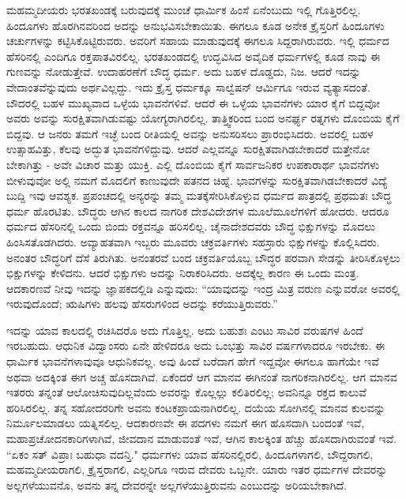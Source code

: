 ಮಹಮ್ಮದೀಯರು ಭರತಖಂಡಕ್ಕೆ ಬರುವುದಕ್ಕೆ ಮುಂಚೆ ಧಾರ್ಮಿಕ ಹಿಂಸೆ ಏನೆಂಬುದು ಇಲ್ಲಿ ಗೊತ್ತಿರಲಿಲ್ಲ. ಹಿಂದೂಗಳು ಹೊರಗಿನವರಿಂದ ಅದನ್ನು ಅನುಭವಿಸಬೇಕಾಯಿತು. ಈಗಲೂ ಕೂಡ ಅನೇಕ ಕ್ರೈಸ್ತರಿಗೆ ಹಿಂದೂಗಳು ಚರ್ಚುಗಳನ್ನು ಕಟ್ಟಿಸಿಕೊಟ್ಟಿರುವರು. ಅವರಿಗೆ ಸಹಾಯ ಮಾಡುವುದಕ್ಕೆ ಈಗಲೂ ಸಿದ್ದರಾಗಿರುವರು. ಇಲ್ಲಿ ಧರ್ಮದ ಹೆಸರಿನಲ್ಲಿ ಎಂದಿಗೂ ರಕ್ತಪಾತವಿರಲಿಲ್ಲ. ಭರತಖಂಡದಲ್ಲಿ ಉದ್ಭವಿಸಿದ ಅವೈದಿಕ ಧರ್ಮಗಳಲ್ಲಿ ಕೂಡ ನಾವು ಈ ಗುಣವನ್ನು ನೋಡುತ್ತೇವೆ. ಉದಾಹರಣೆಗೆ ಬೌದ್ಧ ಧರ್ಮ. ಅದು ಬಹಳ ದೊಡ್ಡದು, ನಿಜ. ಆದರೆ ಇದನ್ನು ವೇದಾಂತವೆನ್ನುವುದು ಅರ್ಥವಿಲ್ಲದ್ದು. ಇದು ಕ್ರೈಸ್ತ ಧರ್ಮಕ್ಕೂ ಸಾಲ್ವೆಷನ್ ಆರ್ಮಿಗೂ ಇರುವ ವ್ಯತ್ಯಾಸದಂತೆ. ಬೌದರಲ್ಲಿ ಬಹಳ ಮುಖ್ಯವಾದ ಒಳ್ಳೆಯ ಭಾವನೆಗಳಿವೆ. ಆದರೆ ಈ ಒಳ್ಳೆಯ ಭಾವನೆಗಳು ಯಾರ ಕೈಗೆ ಬಿದ್ದವೋ ಅವರು ಅವನ್ನು ಸುರಕ್ಷಿತವಾಗಿಡುವಷ್ಟು ಯೋಗ್ಯರಾಗಿರಲಿಲ್ಲ. ತಾತ್ತ್ವಿಕರಿಂದ ಬಂದ ಅನರ್ಘ್ಯ ರತ್ನಗಳು ದೊಂಬಿಯ ಕೈಗೆ ಬಿದ್ದವು. ಆ ಜನರು ತಮಗೆ ಇಚ್ಛೆ ಬಂದ ರೀತಿಯಲ್ಲಿ ಅವನ್ನು ಅನುಸರಿಸಲು ಪ್ರಾರಂಭಿಸಿದರು. ಅವರಲ್ಲಿ ಬಹಳ ಉತ್ಸಾಹವಿತ್ತು, ಕೆಲವು ಅದ್ಭುತ ಭಾವನೆಗಳಿದ್ದುವು. ಆದರೆ ಎಲ್ಲವನ್ನೂ ಸುರಕ್ಷಿತವಾಗಿಡಬೇಕಾದರೆ ಮತ್ತೇನೋ ಬೇಕಾಗಿತ್ತು - ಅವೇ ವಿಚಾರ ಮತ್ತು ಯುಕ್ತಿ. ಎಲ್ಲಿ ದೊಂಬಿಯ ಕೈಗೆ ಸಾರ್ವಜನಿಕರ ಉಪಕಾರಾರ್ಥ ಭಾವನೆಗಳು ಬೀಳುವುವೋ ಅಲ್ಲಿ ನಮಗೆ ಮೊದಲಿಗೆ ಕಾಣುವುದೇ ಪತನದ ಚಿಹ್ನೆ. ಭಾವಗಳನ್ನು ಸುರಕ್ಷಿತವಾಗಿಡಬೇಕಾದರೆ ವಿದ್ಯೆ ಬುದ್ದಿ ಇವು ಆವಶ್ಯಕ. ಪ್ರಪಂಚದಲ್ಲಿ ಅನ್ಯರನ್ನು ತಮ್ಮ ಮತಕ್ಕೆ\break ಸೇರಿಸಿಕೊಳ್ಳುವ ಧರ್ಮದ ಪಾತ್ರದಲ್ಲಿ ಪ್ರಥಮತಃ ಬೌದ್ಧ ಧರ್ಮ ಹೊರಟಿತು. ಬೌದ್ಧರು ಆಗಿನ ಕಾಲದ ನಾಗರಿಕ ದೇಶವಿದೇಶಗಳ ಮೂಲೆಮೂಲೆಗಳಿಗೆ ಹೋದರು. ಆದರೂ ಧರ್ಮದ ಹೆಸರಿನಲ್ಲಿ ಒಂದು ಬಿಂದು ರಕ್ತವನ್ನೂ ಹರಿಸಲಿಲ್ಲ. ಚೈನಾದೇಶದವರು ಬೌದ್ಧ ಭಿಕ್ಷುಗಳನ್ನು ಮೊದಲು ಹಿಂಸಿಸತೊಡಗಿದರು. ಅವ್ಯಾಹತವಾಗಿ ಇಬ್ಬರು ಮೂವರು ಚಕ್ರವರ್ತಿಗಳು ಸಹಸ್ರಾರು ಭಿಕ್ಷುಗಳನ್ನು ಕೊಲ್ಲಿಸಿದರು. ಅನಂತರ ಬೌದ್ಧರಿಗೆ ದೆಸೆ ತಿರುಗಿತು. ಅನಂತರವೆ ಬಂದ ಚಕ್ರವರ್ತಿಯೊಬ್ಬ ಬೌದ್ಧರ ಪರವಾಗಿ ಸೇಡನ್ನು ತೀರಿಸಿಕೊಳ್ಳಲು ಭಿಕ್ಷುಗಳನ್ನು ಕೇಳಿದನು. ಆದರೆ ಭಿಕ್ಷುಗಳು ಅದನ್ನು ನಿರಾಕರಿಸಿದರು. ಅದಕ್ಕೆಲ್ಲ ಕಾರಣ ಈ ಒಂದು ಮಂತ್ರ. ಆದಕಾರಣವೆ ನೀವು ಇದನ್ನು ಜ್ಞಾಪಕದಲ್ಲಿಡಿ ಎನ್ನುವುದು: “ಯಾವುದನ್ನು ಇಂದ್ರ ಮಿತ್ರ ವರುಣ ಎನ್ನುವರೋ ಅವರಲ್ಲಿ ಇರುವುದೊಂದೆ; ಋಷಿಗಳು ಹಲವು ಹೆಸರುಗಳಿಂದ ಅದನ್ನು ಕರೆಯುತ್ತಿರುವರು.”

ಇದನ್ನು ಯಾವ ಕಾಲದಲ್ಲಿ ರಚಿಸಿದರೊ ಅದು ಗೊತ್ತಿಲ್ಲ. ಅದು ಬಹುಶಃ ಎಂಟು ಸಾವಿರ ವರುಷಗಳ ಹಿಂದೆ ಇರಬಹುದು. ಆಧುನಿಕ ವಿದ್ವಾಂಸರು ಏನೇ ಹೇಳಿದರೂ ಅದು ಒಂಭತ್ತು ಸಾವಿರ ವರ್ಷಗಳಾದರೂ ಇರಬೇಕು. ಈ ಧಾರ್ಮಿಕ ಭಾವನೆಗಳಾವುವೂ ಆಧುನಿಕವಲ್ಲ. ಅವು ಹಿಂದೆ ಬರೆದಾಗ ಹೇಗೆ ಇದ್ದವೋ ಈಗಲೂ ಹಾಗೆಯೇ ಇವೆ ಅಥವಾ ಅದಕ್ಕಿಂತ ಈಗ ಅಚ್ಚ ಹೊಸದಾಗಿವೆ. ಏಕೆಂದರೆ ಆಗ ಮಾನವ ಈಗಿನಂತೆ ನಾಗರಿಕನಾಗಿರಲಿಲ್ಲ. ಆಗ ಮಾನವ ಇತರರು ತನ್ನಂತೆ ಆಲೋಚಿಸುವುದಿಲ್ಲವೆಂದು ಅವರನ್ನು ಕೊಲ್ಲಲ್ಲು ಕಲಿತಿರಲಿಲ್ಲ; ಅವನಿನ್ನೂ ರಕ್ತದ ಕಾಲುವೆ ಹರಿಸಿರಲಿಲ್ಲ. ತನ್ನ ಸಹೋದರರಿಗೇ ಅವನು ಕಂಟಕಪ್ರಾಯನಾಗಿರಲಿಲ್ಲ. ದಯೆಯ ಸೋಗಿನಲ್ಲಿ ಮಾನವ ಕುಲವನ್ನು ನಿರ್ಮೂಲಮಾಡಲು ಯತ್ನಿಸಲಿಲ್ಲ. ಆದಕಾರಣವೇ ಈ ಪದಗಳು ನಮಗೆ ಈಗ ಹೊಸದಾಗಿ ಬಂದಂತೆ ಇವೆ, ಮಹಾಪ್ರಚೋದನಕಾರಿಗಳಾಗಿವೆ, ಜೀವದಾನ ಮಾಡುವಂತೆ ಇವೆ, ಆಗಿನ ಕಾಲಕ್ಕಿಂತ ಹೆಚ್ಚು ಹೊಸದಾಗಿರುವಂತೆ ಇವೆ. “ಏಕಂ ಸತ್ ವಿಪ್ರಾಃ ಬಹುಧಾ ವದನ್ತಿ." ಧರ್ಮಗಳು ಯಾವ ಹೆಸರಿನಲ್ಲಿರಲಿ, ಹಿಂದೂಗಳಾಗಲಿ, ಬೌದ್ದರಾಗಲಿ, ಮಹಮ್ಮದೀಯರಾಗಲಿ, ಕ್ರೈಸ್ತರಾಗಲಿ, ಎಲ್ಲರಿಗೂ ಇರುವ ದೇವರು ಒಬ್ಬನೇ. ಯಾರು ಇತರ ಧರ್ಮಗಳ ದೇವರನ್ನು ಅಲ್ಲಗಳೆಯುವನೊ, ಅವನು ತನ್ನ ದೇವರನ್ನೇ ಅಲ್ಲಗಳೆಯುತ್ತಿರುವನು ಎಂಬುದನ್ನು ಅರಿಯಬೇಕಾಗಿದೆ.

